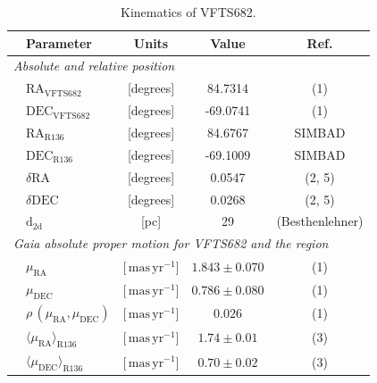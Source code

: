 \documentclass[apjl,twocolumn]{emulateapj}
\newcommand{\masyr}{\,\mathrm{mas}\,\mathrm{yr}^{-1}}
\begin{document}
\begin{table}
  \begin{center}
    \caption{Kinematics of VFTS682. }
    \begin{tabular}{llc|c|c}
      \hline
      \hline
      &Parameter & Units & Value & Ref.\\
      \hline
      \multicolumn{5}{l}{\emph{Absolute and relative position}} \\
      \hline
         &$\mathrm{RA}_\mathrm{VFTS682}$&[degrees] & \phantom{-}84.7314 %
                     & (1) \\        
               &$\mathrm{DEC}_\mathrm{VFTS682}$&[degrees] & -69.0741%
                     & (1)  \\    
                                                     
                        &$\mathrm{RA}_\mathrm{R136}$&[degrees] & \phantom{-}84.6767
                     &  SIMBAD  \\        
               &$     \mathrm{DEC}_\mathrm{R136}$&[degrees] &  -69.1009
                     &  SIMBAD \\       
        &$      \delta\mathrm{RA}$  &[degrees] & \phantom{-0}0.0547                      
        &  (2, 5)
  \\        
               &$     \delta\mathrm{DEC}$  &[degrees] & \phantom{-0}0.0268 
                     &  (2, 5) \\  
                       &$  \mathrm{d_\mathrm{2d}}$  &[pc] & 29
                     &  (Besthenlehner) \\         
                          
                     \hline
           \multicolumn{5}{l}{\emph{Gaia absolute proper motion for VFTS682
      and the region}} \\
      \hline
          &$\mu_\mathrm{RA}$&[$\masyr$] & $1.843\pm 0.070$
                     & (1) \\        
               &$\mu_\mathrm{DEC}$&[$\masyr$] & $0.786\pm 0.080$
                     &  (1) \\        
                 & $\rho\,(\mu_\mathrm{RA}, \mu_\mathrm{DEC})$ &[$\masyr$] & $0.026$
                        & (1)  \\         
       &$\langle\mu_\mathrm{RA}\rangle_\mathrm{R136}$&[$\masyr$] & $1.74\pm0.01$
                        & (3) \\
      &$\langle\mu_\mathrm{DEC}\rangle_\mathrm{R136}$&[$\masyr$]
                & $0.70\pm0.02$ &  (3)\\
\hline
      

\end{tabular}
\end{center}
\end{table}
\end{document}
